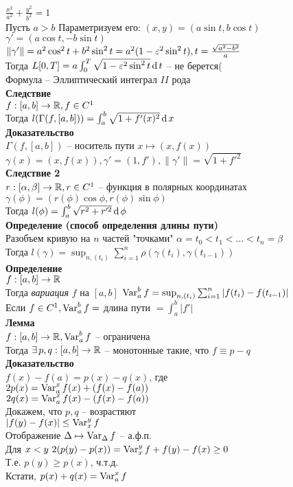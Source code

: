 \documentclass[12pt]{article}
\begin{document}
$\frac{x^2}{a^2} + \frac{y^2}{b^2}=1$\\
Пусть $a > b$
Параметризуем его: $(x, y) = (a\sin t, b\cos t)$\\
$\gamma' = (a\cos t, -b\sin t)$\\
$\|\gamma'\| = a^2\cos^2 t + b^2 \sin^2 t = a^2(1 -\varepsilon^2 \sin^2 t), t = \frac{\sqrt{a^2 - b^2}}{a}$\\
Тогда $L[0,T] = a\int_0^T\sqrt{1-\varepsilon^2 \sin^2 t}\operatorname{d} t$ -- не берется(\\
Формула -- Эллиптический интеграл $II$ рода\\
\textbf{Следствие}\\
$f:[a,b] \rightarrow \mathbb{R}, f\in C^1$\\
Тогда $l(\Gamma(f, [a,b])) = \int_a^b \sqrt{1 + f'(x)^2}\operatorname{d} x$\\
\textbf{Доказательство}\\
$\Gamma(f, [a,b])$ -- носитель пути $x \mapsto (x, f(x))$\\
$\gamma(x) = (x, f(x)), \gamma'=(1,f'), \|\gamma'\| = \sqrt{1 + f'^2}$\\
\textbf{Следствие 2}\\
$r: [\alpha, \beta] \rightarrow \mathbb{R}, r \in C^1$ -- функция в полярных координатах\\
$\gamma(\phi) = (r(\phi)\cos \phi, r(\phi)\sin\phi)$\\
Тогда $l(\phi) = \int_a^b \sqrt{r^2 + r'^2}\operatorname{d} \phi$\\
\textbf{Определение (способ определения длины пути)}\\
Разобъем кривую на $n$ частей "точками" $\alpha = t_0 < t_1 < \ldots < t_n = \beta$\\
Тогда $l(\gamma) = \sup_{n, (t_i)} \sum_{i=1}^n \rho(\gamma(t_i), \gamma(t_{i-1}))$\\
\textbf{Определение}\\
$f:[a, b] \rightarrow \mathbb{R}$\\
Тогда \textit{вариация} $f$ на $[a,b]$ $\operatorname{Var}_a^b f = \sup_{n, (t_i)} \sum_{i=1}^n |f(t_i)-f(t_{i-1})|$\\
Если $f \in C^1, \operatorname{Var}_a^b f = $ длина пути $ = \int_a^b |f'|$\\
\textbf{Лемма}\\
$f:[a,b] \rightarrow \mathbb{R}, \operatorname{Var}_a^b f$ -- ограничена\\
Тогда $\exists\, p,q: [a,b]\rightarrow \mathbb{R}$ -- монотонные такие, что $f\equiv p-q$\\
\textbf{Доказательство}\\
$f(x)-f(a)=p(x)-q(x)$, где\\
$2p(x) = \operatorname{Var}_a^x f(x)+(f(x)-f(a))$\\
$2q(x) = \operatorname{Var}_a^x f(x) - (f(x) - f(a))$\\
Докажем, что $p,q$ -- возрастяют\\
$|f(y)-f(x)| \leq \operatorname{Var}_x^y f$\\
Отображение $\Delta \mapsto \operatorname{Var}_\Delta f$ -- а.ф.п.\\
Для $x < y\ 2(p(y)-p(x))=\operatorname{Var}_x^y f + f(y)-f(x) \geq 0$\\
Т.е. $p(y) \geq p(x)$, ч.т.д.\\
Кстати, $p(x) + q(x) = \operatorname{Var}_a^x f$\\
\end{document}
